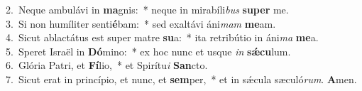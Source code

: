 {2.~}Neque ambulávi in \textbf{ma}gnis:~* neque in mirabíli\textit{bus} \textbf{su}\textbf{per} me.\\
{3.~}Si non humíliter senti\textbf{é}bam:~* sed exaltávi áni\textit{mam} \textbf{me}am.\\
{4.~}Sicut ablactátus est super matre \textbf{su}a:~* ita retribútio in áni\textit{ma} \textbf{me}a.\\
{5.~}Speret Israël in \textbf{Dó}mino:~* ex hoc nunc et usque \textit{in} \textbf{sǽ}\textbf{cu}lum.\\
{6.~}Glória Patri, et \textbf{Fí}lio,~* et Spirítu\textit{i} \textbf{San}cto.\\
{7.~}Sicut erat in princípio, et nunc, et \textbf{sem}per,~* et in sǽcula sæculó\textit{rum}. \textbf{A}men.\\
